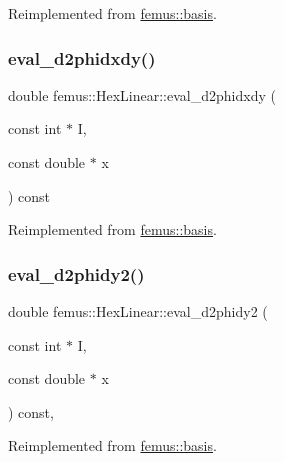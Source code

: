 Reimplemented from \mbox{\hyperlink{classfemus_1_1basis_a0a9839e75d1c9c8302486fc072eed028}{femus\+::basis}}.

\mbox{\label{classfemus_1_1_hex_linear_ab3978e88ab01f8dcf7002024612523be}} 
\subsubsection{\texorpdfstring{eval\+\_\+d2phidxdy()}{eval\_d2phidxdy()}}
{\footnotesize\ttfamily double femus\+::\+Hex\+Linear\+::eval\+\_\+d2phidxdy (\begin{DoxyParamCaption}\item[{const int $\ast$}]{I,  }\item[{const double $\ast$}]{x }\end{DoxyParamCaption}) const\hspace{0.3cm}{\ttfamily [virtual]}}



Reimplemented from \mbox{\hyperlink{classfemus_1_1basis_ac9feaf9e60421143db2a3708f3c7fa48}{femus\+::basis}}.

\mbox{\label{classfemus_1_1_hex_linear_a4a35e276ff9fac58e4ddd84ad147b726}} 
\subsubsection{\texorpdfstring{eval\+\_\+d2phidy2()}{eval\_d2phidy2()}}
{\footnotesize\ttfamily double femus\+::\+Hex\+Linear\+::eval\+\_\+d2phidy2 (\begin{DoxyParamCaption}\item[{const int $\ast$}]{I,  }\item[{const double $\ast$}]{x }\end{DoxyParamCaption}) const\hspace{0.3cm}{\ttfamily [inline]}, {\ttfamily [virtual]}}



Reimplemented from \mbox{\hyperlink{classfemus_1_1basis_a0febb29fe4b32213ff8d6d428f7241cd}{femus\+::basis}}.

